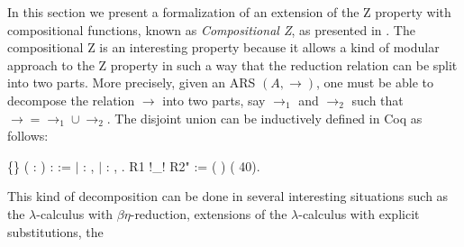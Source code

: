     In this section we present a formalization of an extension of the
    Z property with compositional functions, known as \textit{Compositional
    Z}, as presented in \cite{Nakazawa-Fujita2016}. The
    compositional Z is an interesting property because it allows a
    kind of modular approach to the Z property in such a way that the
    reduction relation can be split into two parts. More precisely,
    given an ARS $(A,\to)$, one must be able to decompose the relation
    $\to$ into two parts, say $\to_1$ and $\to_2$ such that $\to =
    \to_1\cup \to_2$. The disjoint union can be inductively defined in
    Coq as follows: \begin{coqdoccode}
\coqdocemptyline
\coqdocnoindent
{}  \{\} ( :  ) :   := \ensuremath{|} : \coqdockw{\ensuremath{\forall}}  ,          \ensuremath{|} : \coqdockw{\ensuremath{\forall}}  ,         .\coqdoceol
\coqdocemptyline
\coqdocnoindent
{} R1 !\_! R2" := (  ) (  40).\coqdoceol
\coqdocemptyline
\end{coqdoccode}
This kind of decomposition can be done in several interesting
situations such as the $\lambda$-calculus with
$\beta\eta$-reduction\cite{Ba84}, extensions of the
$\lambda$-calculus with explicit substitutions\cite{accl91}, the
